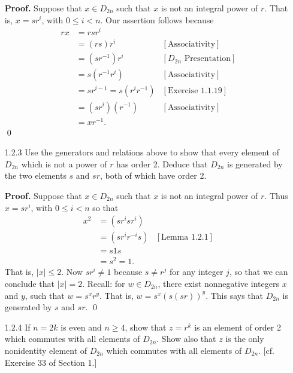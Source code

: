 \begin{enumerate}
      \textbf{Proof.} Suppose that $x \in D_{2n}$ such that $x$ is not an
      integral power of $r$. That is, $x = sr^i$, with $0 \le i < n$. Our 
      assertion follows because
      \begin{align*}
         rx &= rsr^i \\
            &= (rs)r^i &[\text{Associativity}] \\
            &= (sr^{-1})r^i &[D_{2n}\text{ Presentation}] \\
            &= s(r^{-1}r^i) &[\text{Associativity}] \\
            &= sr^{i-1} = s(r^ir^{-1}) &[\text{Exercise 1.1.19}] \\
            &= (sr^i)(r^{-1}) &[\text{Associativity}] \\
            &= xr^{-1}.
      \end{align*}
      \qed
   \item[1.2.3]   Use the generators and relations above to show that every
                  element of $D_{2n}$ which is not a power of $r$ has order 2.
                  Deduce that $D_{2n}$ is generated by the two elements $s$ and
                  $sr$, both of which have order 2.
                  
      \textbf{Proof.} Suppose that $x \in D_{2n}$ such that $x$ is not an
      integral power of $r$. Thus $x = sr^i$, with $0 \le i < n$ so that
      \begin{align*}
         x^2 &= (sr^isr^i) \\
             &= (sr^ir^{-i}s) &[\text{Lemma 1.2.1}] \\
             &= s1s \\
             &= s^2 = 1.
      \end{align*}
      That is, $|x| \le 2$. Now $sr^i \neq 1$ because $s \neq r^j$ for any
      integer $j$, so that we can conclude that $|x| = 2$. Recall: for
      $w \in D_{2n}$, there exist nonnegative integers $x$ and $y$, such that
      $w = s^xr^y$. That is, $w = s^x(s(sr))^y$. This says that $D_{2n}$ is 
      generated by $s$ and $sr$. \qed
   \item[1.2.4]   If $n = 2k$ is even and $n \ge 4$, show that $z = r^k$ is an
                  element of order 2 which commutes with all elements of
                  $D_{2n}$. Show also that $z$ is the only nonidentity element
                  of $D_{2n}$ which commutes with all elements of $D_{2n}$. [cf.
                  Exercise 33 of Section 1.]
                  

\end{enumerate}
